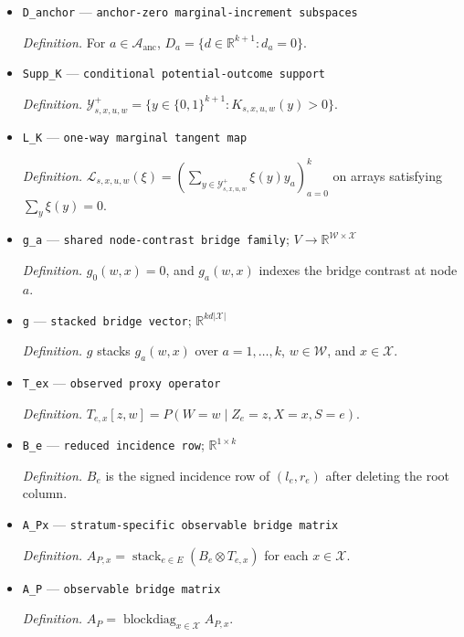 \documentclass{article}
\begin{document}
\begin{itemize}
  \item \texttt{D\_\allowbreak{}anchor} --- \texttt{anchor-\allowbreak{}zero marginal-\allowbreak{}increment subspaces}
  \par\smallskip\noindent\emph{Definition.} For \(a\in\mathcal A_{\mathrm{anc}}\), \(D_a=\{d\in\mathbb R^{k+1}:d_a=0\}\).
  \item \texttt{Supp\_\allowbreak{}K} --- \texttt{conditional potential-\allowbreak{}outcome support}
  \par\smallskip\noindent\emph{Definition.} \(\mathcal Y^+_{s,x,u,w}=\{y\in\{0,1\}^{k+1}:K_{s,x,u,w}(y)>0\}\).
  \item \texttt{L\_\allowbreak{}K} --- \texttt{one-\allowbreak{}way marginal tangent map}
  \par\smallskip\noindent\emph{Definition.} \(\mathscr L_{s,x,u,w}(\xi)=(\sum_{y\in\mathcal Y^+_{s,x,u,w}}\xi(y)y_a)_{a=0}^{k}\) on arrays satisfying \(\sum_y\xi(y)=0\).
  \item \texttt{g\_\allowbreak{}a} --- \texttt{shared node-\allowbreak{}contrast bridge family}; \(V\to\mathbb R^{\mathcal W\times\mathcal X}\)
  \par\smallskip\noindent\emph{Definition.} \(g_0(w,x)=0\), and \(g_a(w,x)\) indexes the bridge contrast at node \(a\).
  \item \texttt{g} --- \texttt{stacked bridge vector}; \(\mathbb R^{k d|\mathcal X|}\)
  \par\smallskip\noindent\emph{Definition.} \(g\) stacks \(g_a(w,x)\) over \(a=1,\ldots,k\), \(w\in\mathcal W\), and \(x\in\mathcal X\).
  \item \texttt{T\_\allowbreak{}ex} --- \texttt{observed proxy operator}
  \par\smallskip\noindent\emph{Definition.} \(T_{e,x}[z,w]=P(W=w\mid Z_e=z,X=x,S=e)\).
  \item \texttt{B\_\allowbreak{}e} --- \texttt{reduced incidence row}; \(\mathbb R^{1\times k}\)
  \par\smallskip\noindent\emph{Definition.} \(B_e\) is the signed incidence row of \((l_e,r_e)\) after deleting the root column.
  \item \texttt{A\_\allowbreak{}Px} --- \texttt{stratum-\allowbreak{}specific observable bridge matrix}
  \par\smallskip\noindent\emph{Definition.} \(A_{P,x}=\operatorname{stack}_{e\in E}(B_e\otimes T_{e,x})\) for each \(x\in\mathcal X\).
  \item \texttt{A\_\allowbreak{}P} --- \texttt{observable bridge matrix}
  \par\smallskip\noindent\emph{Definition.} \(A_P=\operatorname{blockdiag}_{x\in\mathcal X}A_{P,x}\).

\end{itemize}
\end{document}
